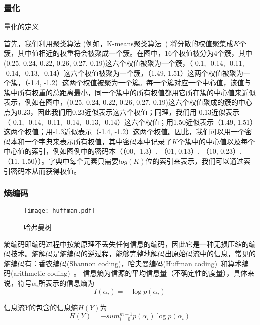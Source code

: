 \subsubsection{量化}
量化的定义

首先，我们利用聚类算法 (例如，K-means聚类算法~\cite{}) 将分散的权值聚集成$K$个簇，其中值相近的权重将会被聚成一个簇。在图中，16个权值被分为4个簇，其中 (0.25, 0.24, 0.22, 0.26, 0.27, 0.19)这六个权值被聚为一个簇，（-0.1, -0.14, -0.11, -0.14, -0.13, -0.14）这六个权值被聚为一个簇，（1.49, 1.51）这两个权值被聚为一个簇，（-1.4, -1.2）这两个权值被聚为一个簇。每一个簇对应一个中心值，该值与簇中所有权重的总距离最小，同一个簇中的所有权值都用它所在簇的中心值来近似表示，例如在图中，(0.25, 0.24, 0.22, 0.26, 0.27, 0.19)这六个权值聚成的簇的中心点为0.23，因此我们用0.23近似表示这六个权值；同理，我们用-0.13近似表示（-0.1, -0.14, -0.11, -0.14, -0.13, -0.14）这六个权值；用1.50近似表示（1.49, 1.51）这两个权值；用-1.3近似表示（-1.4, -1.2）这两个权值。因此，我们可以用一个密码本和一个字典来表示所有权值，其中密码本中记录了$K$个簇中的中心值以及每个中心值的索引，例如图例中的密码本（（00, -1.3）, （01, 0.13）, （10, 0.23）, （11, 1.50））。字典中每个元素只需要$log(K)$位的索引来表示，我们可以通过索引密码本从而获得权值。

\subsubsection{熵编码}

\begin{figure}[h]
\centering
\texttt{[image: huffman.pdf]}
\caption{哈弗曼树}
\label{fig:huffman}
\end{figure}

熵编码即编码过程中按熵原理不丢失任何信息的编码，因此它是一种无损压缩的编码技术。熵解码是熵编码的逆过程，能够完整地解码出原始码流中的信息，常见的熵编码有：香农编码(Shannon coding)，哈夫曼编码(Huffman coding)~\cite{huffman1952method}和算术编码(arithmetic coding)~\cite{witten1987arithmetic}。
信息熵为信源的平均信息量（不确定性的度量），具体来说，符号$\alpha_i$所表示的信息熵为
\begin{equation}
I(\alpha _i) = -\log p(\alpha _i)
\end{equation}

信息流$Y$的包含的信息熵$H(Y)$为
\begin{equation}
H(Y) = -sum_{i=0}^{m-1} p(\alpha _i) \log p(\alpha _i)
\end{equation}

